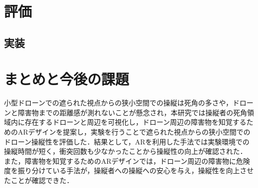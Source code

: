 \documentclass[a4paper,10pt,twocolumn,uplatex]{jsarticle}
\begin{document}

\section{評価}\label{experiment}
\subsection{実装}

\section{まとめと今後の課題}
小型ドローンでの遮られた視点からの狭小空間での操縦は死角の多さや，ドローンと障害物までの距離感が測れないことが懸念され，本研究では操縦者の死角領域内に存在するドローンと周辺を可視化し，ドローン周辺の障害物を知覚するためのARデザインを提案し，実験を行うことで遮られた視点からの狭小空間でのドローン操縦性を評価した．結果として，ARを利用した手法では実験環境での操縦時間が短く，衝突回数も少なかったことから操縦性の向上が確認された．
また，障害物を知覚するためのARデザインでは，ドローン周辺の障害物に危険度を振り分けている手法が，操縦者への操縦への安心を与え，操縦性を向上させたことが確認できた．




\end{document}
